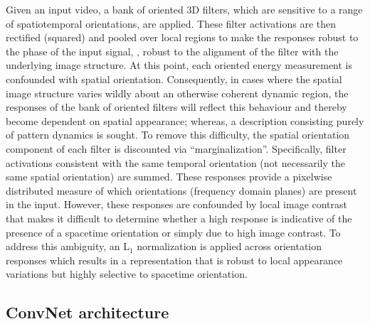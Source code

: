 Given an input video, 
a bank of oriented 3D
filters, which are sensitive to a range of
spatiotemporal orientations, are applied.
These filter activations are then rectified (squared) and
pooled over local regions to make the responses robust
to the phase of the input signal, \ie, robust to the
alignment of the filter with the underlying image
structure. At this point, each oriented energy measurement is confounded with spatial orientation. Consequently, in cases where the 
spatial image structure varies wildly about an otherwise coherent dynamic
region, the responses of the bank of oriented filters will reflect this
behaviour and thereby become dependent on spatial appearance; whereas, a description consisting purely 
of pattern dynamics is sought.
To remove this difficulty, the spatial orientation component of each filter is discounted via ``marginalization''. Specifically, filter activations consistent with the same temporal orientation (not necessarily the same spatial orientation) are summed. 
These responses provide a pixelwise distributed measure
of which orientations (frequency domain planes) are
present in the input.
However, these responses are confounded by local image
contrast that makes 
it difficult to determine
whether a high response is indicative of the presence of
a spacetime orientation or simply due to high image
contrast.
To address this ambiguity, an $\textrm{L}_1$
normalization is applied across orientation responses which
results in a representation that is robust to local
appearance variations but highly selective to 
spacetime orientation.

\subsection{ConvNet architecture}

